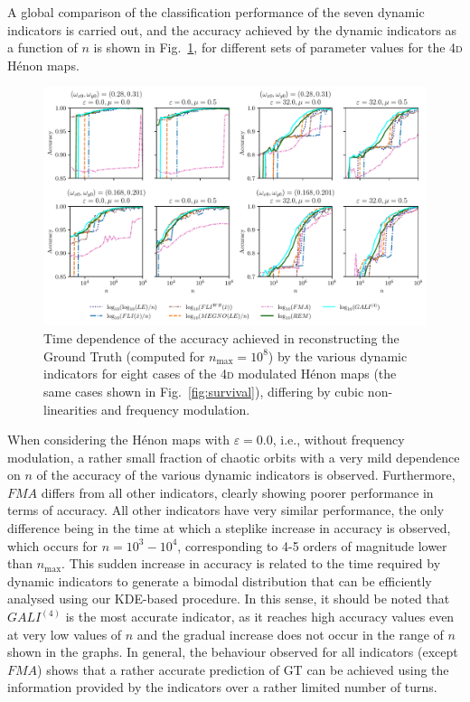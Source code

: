 A global comparison of the classification performance of the seven dynamic indicators is carried out, and the accuracy achieved by the dynamic indicators as a function of $n$ is shown in Fig.~\ref{fig:performance}, for different sets of parameter values for the 4\textsc{d} Hénon maps. 

\begin{figure}[th]
    \centering
    \includegraphics[width=1.0\textwidth]{6_dynamic_indicators/fig/corrected_figs/performance.pdf}
    \caption{Time dependence of the accuracy achieved in reconstructing the Ground Truth (computed for $n_\text{max}=10^8$) by the various dynamic indicators for eight cases of the 4\textsc{d} modulated Hénon maps (the same cases shown in Fig.~\ref{fig:survival}), differing by cubic non-linearities and frequency modulation.}
    \label{fig:performance}
\end{figure}

When considering the Hénon maps with $\varepsilon=0.0$, i.e., without frequency modulation, a rather small fraction of chaotic orbits with a very mild dependence on $n$ of the accuracy of the various dynamic indicators is observed. Furthermore, $FMA$ differs from all other indicators, clearly showing poorer performance in terms of accuracy. All other indicators have very similar performance, the only difference being in the time at which a steplike increase in accuracy is observed, which occurs for $n = 10^3 - 10^4$, corresponding to 4-5 orders of magnitude lower than $n_\text{max}$. This sudden increase in accuracy is related to the time required by dynamic indicators to generate a bimodal distribution that can be efficiently analysed using our KDE-based procedure. In this sense, it should be noted that $GALI^{(4)}$ is the most accurate indicator, as it reaches high accuracy values even at very low values of $n$ and the gradual increase does not occur in the range of $n$ shown in the graphs. In general, the behaviour observed for all indicators (except $FMA$) shows that a rather accurate prediction of GT can be achieved using the information provided by the indicators over a rather limited number of turns.

